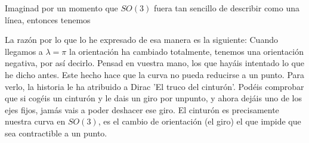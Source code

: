 \documentclass[12pt]{article}
\begin{document}
Imaginad por un momento que $SO(3)$ fuera tan sencillo de describir como una línea, entonces tenemos
\begin{center}
\end{center}
La razón por lo que lo he expresado de esa manera es la siguiente: Cuando llegamos a $\lambda=\pi$ la orientación ha cambiado totalmente, tenemos una orientación negativa, por así decirlo. Pensad en vuestra mano, los que hayáis intentado lo que he dicho antes. Este hecho hace que la curva no pueda reducirse a un punto. Para verlo, la historia le ha atribuido a Dirac 'El truco del cinturón'. Podéis comprobar que si cogéis un cinturón y le dais un giro por unpunto, y ahora dejáis uno de los ejes fijos, jamás vais a poder deshacer ese giro. El cinturón es precisamente nuestra curva en $SO(3)$, es el cambio de orientación (el giro) el que impide que sea contractible a un punto. 
\end{document}

